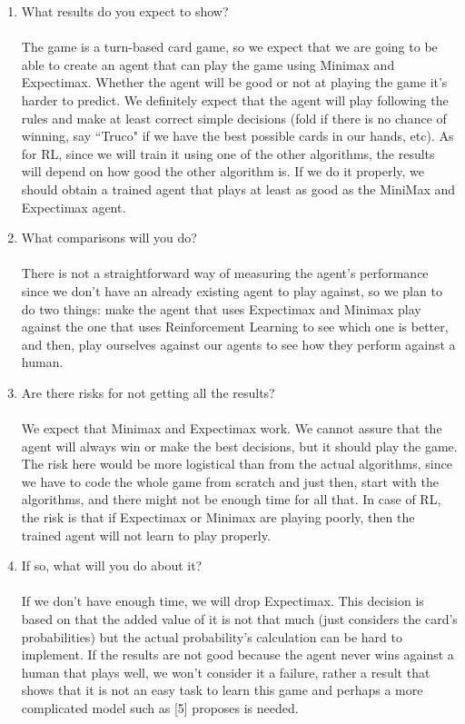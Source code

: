 \documentclass{article}
\begin{document}
\begin{enumerate}
\item What results do you expect to show?
\\\\
The game is a turn-based card game, so we expect that we are going to be able to create an agent that can play the game using Minimax and Expectimax. Whether the agent will be good or not at playing the game it's harder to predict. We definitely expect  that the agent will play following the rules and make at least correct simple decisions (fold if there is no chance of winning, say ``Truco" if we have the best possible cards in our hands, etc). As for RL, since we will train it using one of the other algorithms, the results will depend on how good the other algorithm is. If we do it properly, we should obtain a trained agent that plays at least as good as the MiniMax and Expectimax agent.                                                                                                                     

\item What comparisons will you do?
\\\\
There is not a straightforward way of measuring the agent’s performance since we don’t have an already existing agent to play against, so we plan to do two things: make the agent that uses Expectimax and Minimax play against the one that uses Reinforcement Learning to see which one is better, and then, play ourselves against our agents to see how they perform against a human.
\item Are there risks for not getting all the results?
\\\\ 
We expect that Minimax and Expectimax work. We cannot assure that the agent will always win or make the best decisions, but it should play the game. The risk here would be more logistical than from the actual algorithms, since we have to code the whole game from scratch and just then, start with the algorithms, and there might not be enough time for all that. In case of RL, the risk is that if Expectimax or Minimax are playing poorly, then the trained agent will not learn to play properly.    
    
\item If so, what will you do about it?
\\\\	
If we don't have enough time, we will drop Expectimax. This decision is based on that the added value of it is not that much (just considers the card's probabilities) but the actual probability's calculation can be hard to implement. If the results are not good because the agent never wins against a human that plays well, we won’t consider it a failure, rather a result that shows that it is not an easy task to learn this game and perhaps a more complicated model such as [5] proposes is needed.


\end{enumerate}
\end{document}

